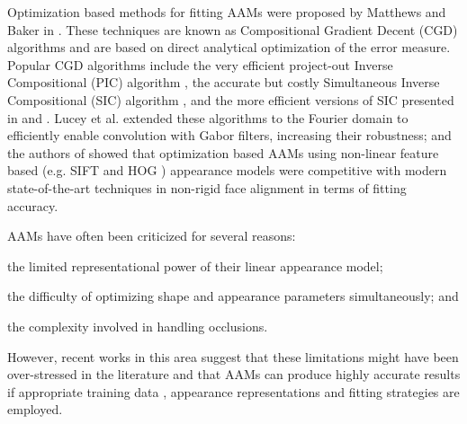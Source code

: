 Optimization based methods for fitting AAMs were proposed by Matthews and Baker in \cite{Matthews2004}. These techniques are known as Compositional Gradient Decent (CGD) algorithms and are based on direct analytical optimization of the error measure. Popular CGD algorithms include the very efficient project-out Inverse Compositional (PIC) algorithm \cite{Matthews2004}, the accurate but costly Simultaneous Inverse Compositional (SIC) algorithm \cite{Gross2005}, and the more efficient versions of SIC presented in \cite{Papandreou2008} and \cite{Tzimiropoulos2013}. Lucey et al. \cite{Lucey2013} extended these algorithms to the Fourier domain to efficiently enable convolution with Gabor filters, increasing their robustness; and the authors of \cite{Antonakos2014} showed that optimization based AAMs using non-linear feature based (e.g. SIFT\cite{Lowe1999} and HOG \cite{Dalal2005}) appearance models were competitive with modern state-of-the-art techniques in non-rigid face alignment \cite{Xiong2013, Asthana2013} in terms of fitting accuracy.

AAMs have often been criticized for several reasons: 
\begin{inparaenum} 
\item the limited representational power of their linear appearance model; 
\item the difficulty of optimizing shape and appearance parameters simultaneously; and
\item the complexity involved in handling occlusions. 
\end{inparaenum}
However, recent works in this area \cite{Papandreou2008, Saragih2009,Tresadern2010, Lucey2013, Tzimiropoulos2013, Antonakos2014} suggest that these limitations might have been over-stressed in the literature and that AAMs can produce highly accurate results if appropriate training data \cite{Tzimiropoulos2013}, appearance representations \cite{Tresadern2010, Lucey2013, Antonakos2014} and fitting strategies \cite{Papandreou2008, Saragih2009, Tresadern2010, Tzimiropoulos2013} are employed.


